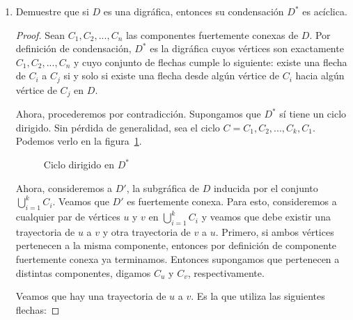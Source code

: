 \documentclass{article}
\begin{document}
\begin{enumerate}
  \item Demuestre que si $D$ es una digr\'afica, entonces su
    condensaci\'on $D^\ast$ es ac\'iclica.

    \begin{proof}
      Sean $C_1, C_2, ..., C_n$ las componentes fuertemente
      conexas de $D$. Por definici\'on de condensaci\'on, $D^\ast$
      es la digr\'afica cuyos v\'ertices son exactamente
      $C_1, C_2, ..., C_n$ y cuyo conjunto de flechas cumple lo
      siguiente: existe una flecha de $C_i$ a $C_j$ si y solo si
      existe una flecha desde alg\'un v\'ertice de $C_i$ hacia
      alg\'un v\'ertice de $C_j$ en $D$.

      Ahora, procederemos por contradicci\'on. Supongamos que
      $D^\ast$ s\'i tiene un ciclo dirigido. Sin p\'erdida de
      generalidad, sea el ciclo $C = C_1, C_2, ..., C_k, C_1$.
      Podemos verlo en la figura~\ref{fig:cycle}.

      \begin{figure}[h]
        \centering
        \caption{Ciclo dirigido en $D^\ast$}
        \label{fig:cycle}
      \end{figure}

      Ahora, consideremos a $D'$, la subgráfica de $D$ inducida
      por el conjunto $\bigcup\limits_{i=1}^{k}C_i$. Veamos que
      $D'$ es fuertemente conexa. Para esto, consideremos
      a cualquier par de vértices $u$ y $v$ en
      $\bigcup\limits_{i=1}^{k}C_i$ y veamos que debe existir una
      trayectoria de $u$ a $v$ y otra trayectoria de $v$ a $u$.
      Primero, si ambos vértices pertenecen a la misma
      componente, entonces por definición de componente
      fuertemente conexa ya terminamos. Entonces supongamos que
      pertenecen a distintas componentes, digamos $C_u$ y $C_v$,
      respectivamente.

      Veamos que hay una trayectoria de $u$ a $v$. Es la que
      utiliza las siguientes flechas:


\end{proof}
\end{enumerate}
\end{document}
